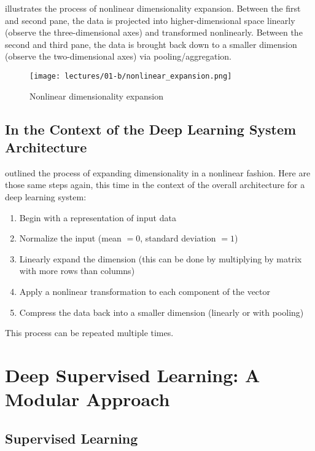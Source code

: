  illustrates the process of nonlinear dimensionality expansion.
Between the first and second pane, the data is projected into higher-dimensional space linearly (observe the three-dimensional axes) and transformed nonlinearly.
Between the second and third pane, the data is brought back down to a smaller dimension (observe the two-dimensional axes) via pooling/aggregation.

\begin{figure}[ht]
\centering
\texttt{[image: lectures/01-b/nonlinear\_expansion.png]}
\caption{Nonlinear dimensionality expansion}
\label{fig:nonlinear_expansion}
\end{figure}

\section{In the Context of the Deep Learning System Architecture}

 outlined the process of expanding dimensionality in a nonlinear fashion.
Here are those same steps again, this time in the context of the overall architecture for a deep learning system:
\begin{enumerate}
    \item Begin with a representation of input data
    \item Normalize the input (mean $= 0$, standard deviation $= 1$)
    \item Linearly expand the dimension (this can be done by multiplying by matrix with more rows than columns)
    \item Apply a nonlinear transformation to each component of the vector
    \item Compress the data back into a smaller dimension (linearly or with pooling)
\end{enumerate}
This process can be repeated multiple times.

\chapter{Deep Supervised Learning: A Modular Approach}

\section{Supervised Learning}\label{sec: supervised learning}

